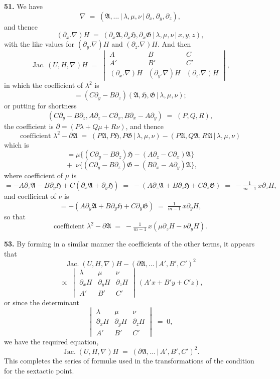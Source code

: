 \documentclass[11pt,a4paper]{article}
\providecommand{\mid}{\,|\,}
\providecommand{\Jac}{\operatorname{Jac.}}
\begin{document}
\textbf{51.} We have
\[
\nabla \;=\; (\mathfrak{A},\ldots\mid \lambda,\mu,\nu\mid \partial_x,\partial_y,\partial_z),
\]
and thence
\[
(\partial_x.\nabla)H \;=\; (\partial_x\mathfrak{A},\partial_x\mathfrak{H},\partial_x\mathfrak{G}\mid \lambda,\mu,\nu\mid x,y,z),
\]
with the like values for $(\partial_y.\nabla)H$ and $(\partial_z.\nabla)H$. And then
\[
\Jac(U,H,\nabla)H \;=\; \begin{vmatrix} A & B & C \\ A' & B' & C' \\ (\partial_x.\nabla)H & (\partial_y.\nabla)H & (\partial_z.\nabla)H \end{vmatrix},
\]
in which the coefficient of $\lambda^2$ is
\[
= (C\partial_y - B\partial_z)(\mathfrak{A},\mathfrak{H},\mathfrak{G}\mid \lambda,\mu,\nu);
\]
or putting for shortness
\[
(C\partial_y - B\partial_z, A\partial_z - C\partial_x, B\partial_x - A\partial_y) \;=\; (P,Q,R),
\]
the coefficient is $\partial = (P\lambda + Q\mu + R\nu)$,
and thence
\[
\text{coefficient } \lambda^2 - \partial\mathfrak{A} \;=\; (P\mathfrak{A},P\mathfrak{H},P\mathfrak{G}\mid \lambda,\mu,\nu) - (P\mathfrak{A},Q\mathfrak{A},R\mathfrak{A}\mid \lambda,\mu,\nu)
\]
which is
\[
= \mu\bigl\{(C\partial_y - B\partial_z)\mathfrak{H} - (A\partial_z - C\partial_x)\mathfrak{A}\bigr\}
\]
\[
\;+\; \nu\bigl\{(C\partial_y - B\partial_z)\mathfrak{G} - (B\partial_x - A\partial_y)\mathfrak{A}\bigr\},
\]
where coefficient of $\mu$ is
\[
= -A\partial_z\mathfrak{A} - B\partial_y\mathfrak{H} + C(\partial_x\mathfrak{A} + \partial_y\mathfrak{H}) \;=\; -(A\partial_z\mathfrak{A} + B\partial_z\mathfrak{H} + C\partial_z\mathfrak{G}) \;=\; -\tfrac{1}{m-1}\,x\partial_z H,
\]
and coefficient of $\nu$ is
\[
= +(A\partial_y\mathfrak{A} + B\partial_y\mathfrak{H} + C\partial_y\mathfrak{G}) \;=\; \tfrac{1}{m-1}\,x\partial_y H,
\]
so that
\[
\text{coefficient } \lambda^2 - \partial\mathfrak{A} \;=\; -\tfrac{1}{m-1}\,x(\mu\partial_z H - \nu\partial_y H).
\]

\medskip

\textbf{53.} By forming in a similar manner the coefficients of the other terms, it appears that
\[
\Jac(U,H,\nabla)H - (\partial\mathfrak{A},\ldots\mid A',B',C')^2
\]
\[
\;\propto\; \begin{vmatrix} \lambda & \mu & \nu \\ \partial_x H & \partial_y H & \partial_z H \\ A' & B' & C' \end{vmatrix}\,(A'x + B'y + C'z),
\]
or since the determinant
\[
\begin{vmatrix} \lambda & \mu & \nu \\ \partial_x H & \partial_y H & \partial_z H \\ A' & B' & C' \end{vmatrix} \;=\; 0,
\]
we have the required equation,
\[
\Jac(U,H,\nabla)H \;=\; (\partial\mathfrak{A},\ldots\mid A',B',C')^2.
\]
This completes the series of formul{\ae} used in the transformations of the condition for the sextactic point.
\end{document}

